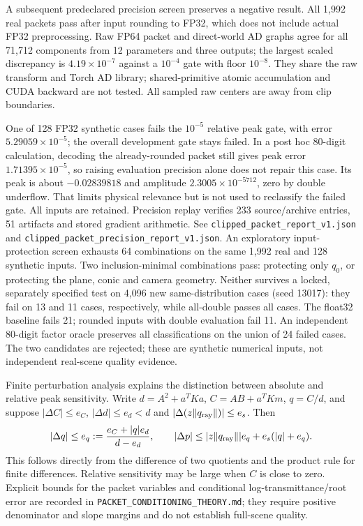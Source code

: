 \documentclass[11pt,a4paper]{article}
\begin{document}
A subsequent predeclared precision screen preserves a negative result.
All 1,992 real packets pass after input rounding to FP32, which does
not include actual FP32 preprocessing. Raw FP64 packet and direct-world
AD graphs agree for all 71,712 components from 12 parameters and three
outputs; the largest scaled discrepancy is $4.19\times10^{-7}$ against
a $10^{-4}$ gate with floor $10^{-8}$. They share the raw transform
and Torch AD library; shared-primitive atomic accumulation and CUDA
backward are not tested. All sampled raw centers are away from clip boundaries.

One of 128 FP32 synthetic cases fails the $10^{-5}$ relative peak gate,
with error $5.29059\times10^{-5}$; the overall development gate stays
failed. In a post hoc 80-digit calculation, decoding the already-rounded
packet still gives peak error $1.71395\times10^{-5}$, so raising
evaluation precision alone does not repair this case. Its peak is about
$-0.02839818$ and amplitude $2.3005\times10^{-5712}$, zero by double
underflow. That limits physical relevance but is not used to reclassify
the failed gate. All inputs are retained. Precision replay verifies
233 source/archive entries, 51 artifacts and stored gradient arithmetic.
See \texttt{clipped\_packet\_report\_v1.json} and
\texttt{clipped\_packet\_precision\_report\_v1.json}.
An exploratory input-protection screen exhausts 64 combinations on
the same 1,992 real and 128 synthetic inputs. Two inclusion-minimal
combinations pass: protecting only $q_0$, or protecting the plane,
conic and camera geometry. Neither survives a locked, separately
specified test on 4,096 new same-distribution cases (seed 13017):
they fail on 13 and 11 cases, respectively, while all-double passes
all cases. The float32 baseline fails 21; rounded inputs with double
evaluation fail 11. An independent 80-digit factor oracle preserves
all classifications on the union of 24 failed cases. The two
candidates are rejected; these are synthetic numerical inputs,
not independent real-scene quality evidence.

Finite perturbation analysis explains the distinction between
absolute and relative peak sensitivity. Write $d=A^2+a^TKa$,
$C=AB+a^TKm$, $q=C/d$, and suppose
$|\Delta C|\leq e_C$, $|\Delta d|\leq e_d<d$ and
$|\Delta(z\|q_{\rm ray}\|)|\leq e_s$. Then
\[
 |\Delta q|\leq e_q:=\frac{e_C+|q|e_d}{d-e_d},\qquad
 |\Delta p|\leq |z\|q_{\rm ray}\||e_q+e_s(|q|+e_q).
\]
This follows directly from the difference of two quotients and
the product rule for finite differences. Relative sensitivity may
be large when $C$ is close to zero. Explicit bounds for the packet
variables and conditional log-transmittance/root error are recorded
in \texttt{PACKET\_CONDITIONING\_THEORY.md}; they require positive
denominator and slope margins and do not establish full-scene quality.
\end{document}
